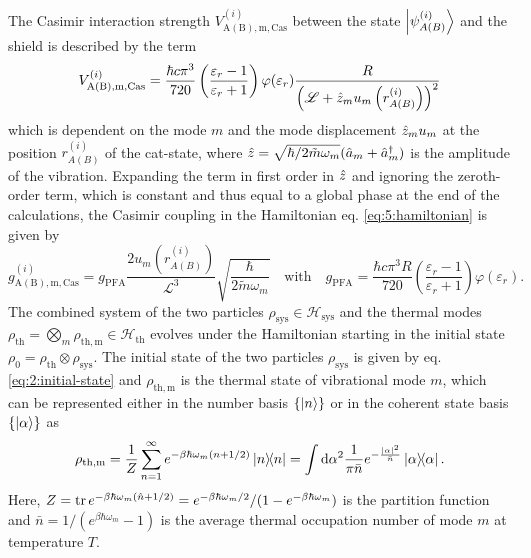 The Casimir interaction strength $V^{(i)}_\mathrm{A(B),m,Cas}$ between the state $\ket{\psi^{(i)}_{A(B)}}$ and the shield is described by the term 
\begin{equation}
  V^{(i)}_\mathrm{A(B),m,Cas} = \frac{\hbar c \pi^3}{720}\left(\frac{\varepsilon_r - 1}{\varepsilon_r + 1}\right) \varphi(\varepsilon_r) \frac{R}{\left(\mathscr{L} + \hat{z}_m u_m\left(r^{(i)}_{A(B)}\right)\right)^2}
\end{equation}
which is dependent on the mode $m$ and the mode displacement $\hat{z}_m u_m$ at the position $r^{(i)}_{A(B)}$ of the cat-state, where $\hat{z} = \sqrt{\hbar/2\tilde{m}\omega_m}(\hat{a}_m + \hat{a}^\dagger_m)$ is the amplitude of the vibration.
Expanding the term in first order in $\hat{z}$ and ignoring the zeroth-order term, which is constant and thus equal to a global phase at the end of the calculations, the Casimir coupling in the Hamiltonian eq. \eqref{eq:5:hamiltonian} is given by
\begin{equation}
  g^{(i)}_\mathrm{A(B),m,Cas} = g_\mathrm{PFA} \frac{2 u_m(r^{(i)}_{A(B)})}{\mathscr{L}^3} \sqrt{\frac{\hbar}{2\tilde{m}\omega_m}}
  \quad \text{with} \quad 
  g_\mathrm{PFA} = \frac{\hbar c \pi^3 R}{720} \left(\frac{\varepsilon_r - 1}{\varepsilon_r + 1}\right) \varphi(\varepsilon_r) .
\end{equation} 
The combined system of the two particles $\rho_\mathrm{sys} \in \mathcal{H}_\mathrm{sys}$ and the thermal modes $\rho_\mathrm{th} = \bigotimes_m \rho_\mathrm{th, m} \in \mathcal{H}_\mathrm{th}$ evolves under the Hamiltonian starting in the initial state $\rho_0 = \rho_\mathrm{th} \otimes \rho_\mathrm{sys}$. 
The initial state of the two particles $\rho_\mathrm{sys}$ is given by eq. \eqref{eq:2:initial-state} and $\rho_\mathrm{th,m}$ is the thermal state of vibrational mode $m$, which can be represented either in the number basis $\{\ket{n}\}$ or in the coherent state basis $\{\ket{\alpha}\}$ as \cite{Steiner_2024}
\begin{equation}
  \rho_\mathrm{th,m} = \frac{1}{Z} \sum_{n=1}^\infty e^{-\beta \hbar \omega_m (n + 1/2)} \ketbra{n} = \int \dd \alpha^2 \frac{1}{\pi \bar{n}} e^{-\frac{\left\lvert\alpha\right\rvert^2}{\bar{n}}} \ketbra{\alpha} .
\end{equation} 
Here, $Z = \tr e^{-\beta \hbar \omega_m (\hat{n}+1/2)} = e^{-\beta \hbar \omega_m/2}/(1-e^{-\beta \hbar \omega_m})$ is the partition function and $\bar{n} = 1/(e^{\beta \hbar \omega_m} - 1)$ is the average thermal occupation number of mode $m$ at temperature $T$. 

